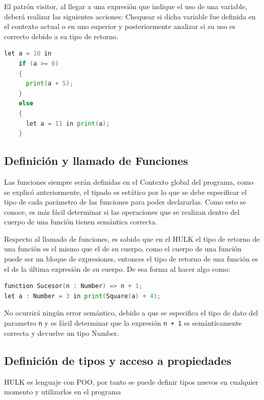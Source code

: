 \documentclass[11pt, a4paper, twoside]{article} %
\begin{document}
El patr\'on visitor, al llegar a una expresi\'on que indique el uso de una variable, deber\'a realizar las siguientes acciones: Chequear si dicha variable fue definida en el 
contexto actual o en uno superior y posteriormente analizar si su uso es correcto debido a su tipo de retorno.\\

\begin{lstlisting}[language=Go]
  let a = 10 in
    if (a >= 0)
    {
      print(a + 5);
    }
    else
    {
      let a = 11 in print(a);
    }
\end{lstlisting}

\subsection{Definici\'on y llamado de Funciones}
Las funciones siempre ser\'an definidas en el Contexto global del programa, como se explic\'o anteriormente, el tipado es est\'atico por lo que se debe especificar el tipo de cada 
par\'ametro de las funciones para poder declararlas. Como esto se conoce, es m\'as f\'acil determinar si las operaciones que se realizan dentro del cuerpo de una funci\'on 
tienen sem\'antica correcta.

Respecto al llamado de funciones, es sabido que en el HULK el tipo de retorno de una funci\'on es el mismo que el de su cuerpo, como el cuerpo de una funci\'on
puede ser un bloque de expresiones, entonces el tipo de retorno de una funci\'on es el de la \'ultima expresi\'on de su cuerpo. De esa forma al hacer algo como:\\

\begin{lstlisting}[language=Go]
function Sucesor(n : Number) => n + 1;
let a : Number = 3 in print(Square(a) + 4);
\end{lstlisting}

No ocurrir\'a ning\'un error sem\'antico, debido a que se especifica el tipo de dato del parametro \texttt{n} y es f\'acil determinar que la expresi\'on
\texttt{n + 1} es sem\'anticamente correcta y devuelve un tipo Number.

\subsection{Definici\'on de tipos y acceso a propiedades}
HULK es lenguaje con POO, por tanto se puede definir tipos nuevos en cualquier momento y utilizarlos en el programa
\end{document}
